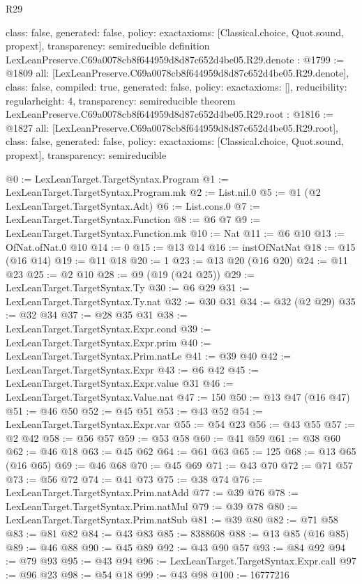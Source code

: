 \begin{lexlean}{R29}
\begin{coremodule}
{  class: false,
  generated: false,
  policy: exact{axioms: [Classical.choice, Quot.sound, propext]},
  transparency: semireducible
}
definition LexLeanPreserve.C69a0078cb8f644959d8d87c652d4be05.R29.denote : @1799 := @1809 {
  all: [LexLeanPreserve.C69a0078cb8f644959d8d87c652d4be05.R29.denote],
  class: false,
  compiled: true,
  generated: false,
  policy: exact{axioms: []},
  reducibility: regular{height: 4},
  transparency: semireducible
}
theorem LexLeanPreserve.C69a0078cb8f644959d8d87c652d4be05.R29.root : @1816 := @1827 {
  all: [LexLeanPreserve.C69a0078cb8f644959d8d87c652d4be05.R29.root],
  class: false,
  generated: false,
  policy: exact{axioms: [Classical.choice, Quot.sound, propext]},
  transparency: semireducible
}

@0 := LexLeanTarget.TargetSyntax.Program
@1 := LexLeanTarget.TargetSyntax.Program.mk
@2 := List.nil.{0}
@5 := @1 (@2 LexLeanTarget.TargetSyntax.Adt)
@6 := List.cons.{0}
@7 := LexLeanTarget.TargetSyntax.Function
@8 := @6 @7
@9 := LexLeanTarget.TargetSyntax.Function.mk
@10 := Nat
@11 := @6 @10
@13 := OfNat.ofNat.{0} @10
@14 := 0
@15 := @13 @14
@16 := instOfNatNat
@18 := @15 (@16 @14)
@19 := @11 @18
@20 := 1
@23 := @13 @20 (@16 @20)
@24 := @11 @23
@25 := @2 @10
@28 := @9 (@19 (@24 @25))
@29 := LexLeanTarget.TargetSyntax.Ty
@30 := @6 @29
@31 := LexLeanTarget.TargetSyntax.Ty.nat
@32 := @30 @31
@34 := @32 (@2 @29)
@35 := @32 @34
@37 := @28 @35 @31
@38 := LexLeanTarget.TargetSyntax.Expr.cond
@39 := LexLeanTarget.TargetSyntax.Expr.prim
@40 := LexLeanTarget.TargetSyntax.Prim.natLe
@41 := @39 @40
@42 := LexLeanTarget.TargetSyntax.Expr
@43 := @6 @42
@45 := LexLeanTarget.TargetSyntax.Expr.value @31
@46 := LexLeanTarget.TargetSyntax.Value.nat
@47 := 150
@50 := @13 @47 (@16 @47)
@51 := @46 @50
@52 := @45 @51
@53 := @43 @52
@54 := LexLeanTarget.TargetSyntax.Expr.var
@55 := @54 @23
@56 := @43 @55
@57 := @2 @42
@58 := @56 @57
@59 := @53 @58
@60 := @41 @59
@61 := @38 @60
@62 := @46 @18
@63 := @45 @62
@64 := @61 @63
@65 := 125
@68 := @13 @65 (@16 @65)
@69 := @46 @68
@70 := @45 @69
@71 := @43 @70
@72 := @71 @57
@73 := @56 @72
@74 := @41 @73
@75 := @38 @74
@76 := LexLeanTarget.TargetSyntax.Prim.natAdd
@77 := @39 @76
@78 := LexLeanTarget.TargetSyntax.Prim.natMul
@79 := @39 @78
@80 := LexLeanTarget.TargetSyntax.Prim.natSub
@81 := @39 @80
@82 := @71 @58
@83 := @81 @82
@84 := @43 @83
@85 := 8388608
@88 := @13 @85 (@16 @85)
@89 := @46 @88
@90 := @45 @89
@92 := @43 @90 @57
@93 := @84 @92
@94 := @79 @93
@95 := @43 @94
@96 := LexLeanTarget.TargetSyntax.Expr.call
@97 := @96 @23
@98 := @54 @18
@99 := @43 @98
@100 := 16777216

\end{coremodule}
\end{lexlean}
